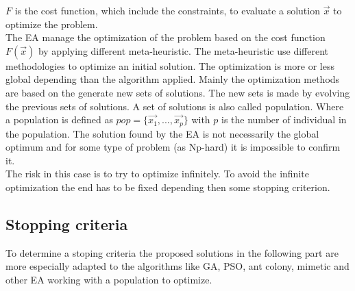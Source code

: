  $F$ is the cost function, which include the constraints, to evaluate a solution $\vec{x}$ to optimize the problem. \\
The EA manage the optimization of the problem based on the cost function $F(\vec{x})$ by applying different meta-heuristic. 
The meta-heuristic use different methodologies to optimize an initial solution. The optimization is more or less global depending than the algorithm applied. 
Mainly the optimization methods are based on the generate new sets of solutions. The new sets is made by evolving the previous sets of solutions. A set of solutions is also called population. %
Where a population is defined as $pop=\{\vec{x_1}, ...,\vec{x_p}  \}$ with $p$ is the number of individual in the population. 
The solution found by the EA is not necessarily the global optimum and for some type of problem (as Np-hard) it is impossible to confirm it. \\
The risk in this case is to try to optimize infinitely. To avoid the infinite optimization the end has to be fixed depending then some stopping criterion.

\subsection{Stopping criteria}
 
To  determine a stoping criteria  the proposed solutions in the following part are more especially adapted to the algorithms like GA, PSO, ant colony, mimetic and other EA working with a population to optimize.


